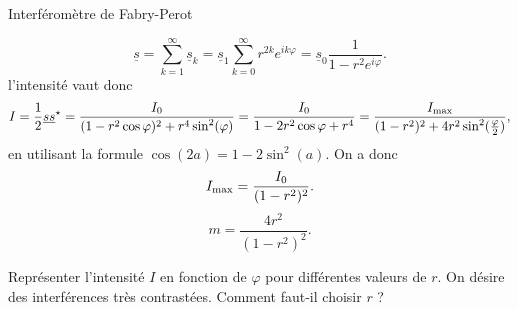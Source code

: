 \begin{exo}[1][devoir]{Interféromètre de Fabry-Perot}
\begin{questions}
{    $$\underline{s} = \sum_{k=1}^{\infty} \underline{s}_k = \underline{s}_1 \sum_{k=0}^{\infty} r^{2k} e^{i k \varphi} = \underline{s}_0\frac{1}{1-r^2e^{i\varphi}}.$$
    l’intensité vaut donc 
    $$
  I = \frac{1}{2} \underline{s} \underline{s}^\star = \frac{I_0}{(1-r^2\cos\varphi)^2 + r^4 \sin^2(\varphi) } = \frac{I_0}{1 - 2r^2\cos\varphi + r^4} = \frac{I_{\rm max}}{(1-r^2)^2 + 4r^2 \sin^2(\frac{\varphi}{2})},
    $$
    en utilisant la formule $\cos(2a) = 1-2\sin^2(a)$. On a donc
    $$
    I_{\rm max} = \frac{I_0}{(1-r^2)^2}.
    $$ 
    $$\boxed{
      m = \frac{4r^2}{(1-r^2)^2}.
    }$$}
  \item Représenter l'intensité $I$ en fonction de $\varphi$ pour différentes valeurs de $r$. On désire des interférences très contrastées. Comment faut-il choisir $r$ ?
  \end{questions}
  \end{exo}
  